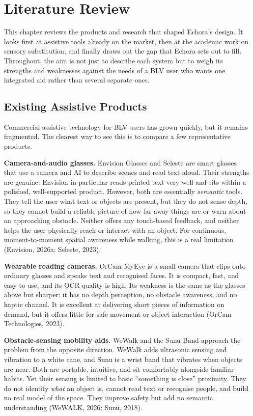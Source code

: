 \chapter{Literature Review}
\label{ch:lit}

This chapter reviews the products and research that shaped Echora's design. It looks first at assistive tools already on the market, then at the academic work on sensory substitution, and finally draws out the gap that Echora sets out to fill. Throughout, the aim is not just to describe each system but to weigh its strengths and weaknesses against the needs of a BLV user who wants one integrated aid rather than several separate ones.

\section{Existing Assistive Products}

Commercial assistive technology for BLV users has grown quickly, but it remains fragmented. The clearest way to see this is to compare a few representative products.

\textbf{Camera-and-audio glasses.} Envision Glasses and Seleste are smart glasses that use a camera and AI to describe scenes and read text aloud. Their strengths are genuine: Envision in particular reads printed text very well and sits within a polished, well-supported product. However, both are essentially \emph{semantic} tools. They tell the user what text or objects are present, but they do not sense depth, so they cannot build a reliable picture of how far away things are or warn about an approaching obstacle. Neither offers any touch-based feedback, and neither helps the user physically reach or interact with an object. For continuous, moment-to-moment spatial awareness while walking, this is a real limitation (Envision, 2026a; Seleste, 2023).

\textbf{Wearable reading cameras.} OrCam MyEye is a small camera that clips onto ordinary glasses and speaks text and recognised faces. It is compact, fast, and easy to use, and its OCR quality is high. Its weakness is the same as the glasses above but sharper: it has no depth perception, no obstacle awareness, and no haptic channel. It is excellent at delivering short pieces of information on demand, but it offers little for safe movement or object interaction (OrCam Technologies, 2023).

\textbf{Obstacle-sensing mobility aids.} WeWalk and the Sunu Band approach the problem from the opposite direction. WeWalk adds ultrasonic sensing and vibration to a white cane, and Sunu is a wrist band that vibrates when objects are near. Both are portable, intuitive, and sit comfortably alongside familiar habits. Yet their sensing is limited to basic ``something is close'' proximity. They do not identify \emph{what} an object is, cannot read text or recognise people, and build no real model of the space. They improve safety but add no semantic understanding (WeWALK, 2026; Sunu, 2018).

